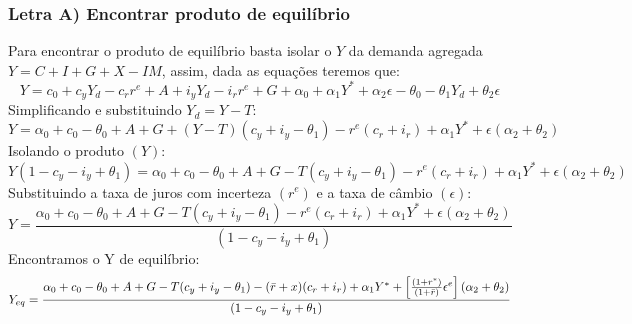 \documentclass{article}
\begin{document}
\subsubsection*{Letra A) Encontrar produto de equilíbrio}
Para encontrar o produto de equilíbrio basta isolar o $Y$ da demanda agregada $Y=C+I+G+X-IM$, assim, dada as equações teremos que:
\begin{equation}
    Y = c_0 + c_y Y_d - c_r r^e + A+i_y Y_d - i_r r^e + G + \alpha_0+\alpha_1 Y^* + \alpha_2 \epsilon - \theta_0-\theta_1 Y_d + \theta_2 \epsilon
\end{equation}
Simplificando e substituindo $Y_d=Y-T$:
\begin{equation*}
    Y = \alpha_0+c_0-\theta_0+A+G+(Y-T)(c_y + i_y-\theta_1)-r^e(c_r+i_r)+\alpha_1 Y^* + \epsilon (\alpha_2+\theta_2)
\end{equation*}
Isolando o produto $(Y)$:
\begin{equation*}
    Y(1-c_y - i_y+\theta_1)= \alpha_0+c_0-\theta_0+A+G-T(c_y + i_y-\theta_1)-r^e(c_r+i_r)+\alpha_1 Y^* + \epsilon (\alpha_2+\theta_2)
\end{equation*}
Substituindo a taxa de juros com incerteza $(r^e)$ e a taxa de câmbio $(\epsilon)$:
\begin{equation*}
    Y= \frac{\alpha_0+c_0-\theta_0+A+G-T(c_y + i_y-\theta_1)-r^e(c_r+i_r)+\alpha_1 Y^* + \epsilon (\alpha_2+\theta_2)}{(1-c_y - i_y+\theta_1)}
\end{equation*}
Encontramos o Y de equilíbrio:
\begin{equation}
    Y_{eq}= \frac{\alpha_0+c_0-\theta_0+A+G-T(c_y + i_y-\theta_1)-(\Bar{r}+x)(c_r+i_r)+\alpha_1 Y^* + \left[\frac{(1+r^*)}{(1+\Bar{r})}\epsilon^e\right](\alpha_2+\theta_2)}{(1-c_y - i_y+\theta_1)}
\end{equation}
\end{document}

